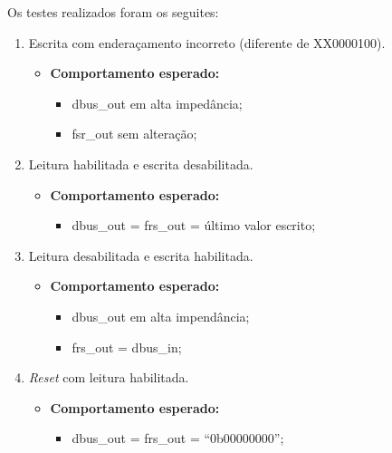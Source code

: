 \documentclass{article}
\begin{document}
Os testes realizados foram os seguites:

\begin{enumerate}
    \item Escrita com enderaçamento incorreto (diferente de XX0000100).
    \begin{itemize}
        \item \textbf{Comportamento esperado:}
        \begin{itemize}
            \item dbus\_out em alta impedância;
            \item fsr\_out sem alteração;
        \end{itemize}
    \end{itemize}
    
    \item Leitura habilitada e escrita desabilitada.
    \begin{itemize}
        \item \textbf{Comportamento esperado:}
        \begin{itemize}
            \item dbus\_out = frs\_out = último valor escrito;
        \end{itemize}
    \end{itemize}

    \item Leitura desabilitada e escrita habilitada.
    \begin{itemize}
        \item \textbf{Comportamento esperado:}
        \begin{itemize}
            \item dbus\_out em alta impendância;
            \item frs\_out = dbus\_in;
        \end{itemize}
    \end{itemize}

    \item \textit{Reset} com leitura habilitada.
    \begin{itemize}
        \item \textbf{Comportamento esperado:}
        \begin{itemize}
            \item dbus\_out = frs\_out = ``0b00000000'';
        \end{itemize}
    \end{itemize}
\end{enumerate}
\end{document}
